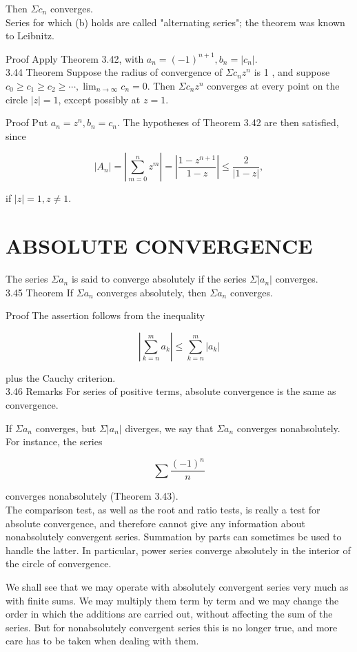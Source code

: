 \documentclass[10pt]{article}
\begin{document}
Then $\Sigma c_{n}$ converges.\\
Series for which (b) holds are called "alternating series"; the theorem was known to Leibnitz.

Proof Apply Theorem 3.42, with $a_{n}=(-1)^{n+1}, b_{n}=\left|c_{n}\right|$.\\
3.44 Theorem Suppose the radius of convergence of $\Sigma c_{n} z^{n}$ is 1 , and suppose $c_{0} \geq c_{1} \geq c_{2} \geq \cdots, \lim _{n \rightarrow \infty} c_{n}=0$. Then $\Sigma c_{n} z^{n}$ converges at every point on the circle $|z|=1$, except possibly at $z=1$.

Proof Put $a_{n}=z^{n}, b_{n}=c_{n}$. The hypotheses of Theorem 3.42 are then satisfied, since

$$
\left|A_{n}\right|=\left|\sum_{m=0}^{n} z^{m}\right|=\left|\frac{1-z^{n+1}}{1-z}\right| \leq \frac{2}{|1-z|},
$$

if $|z|=1, z \neq 1$.

\section*{ABSOLUTE CONVERGENCE}
The series $\Sigma a_{n}$ is said to converge absolutely if the series $\Sigma\left|a_{n}\right|$ converges.\\
3.45 Theorem If $\Sigma a_{n}$ converges absolutely, then $\Sigma a_{n}$ converges.

Proof The assertion follows from the inequality

$$
\left|\sum_{k=n}^{m} a_{k}\right| \leq \sum_{k=n}^{m}\left|a_{k}\right|
$$

plus the Cauchy criterion.\\
3.46 Remarks For series of positive terms, absolute convergence is the same as convergence.

If $\Sigma a_{n}$ converges, but $\Sigma\left|a_{n}\right|$ diverges, we say that $\Sigma a_{n}$ converges nonabsolutely. For instance, the series

$$
\sum \frac{(-1)^{n}}{n}
$$

converges nonabsolutely (Theorem 3.43).\\
The comparison test, as well as the root and ratio tests, is really a test for absolute convergence, and therefore cannot give any information about nonabsolutely convergent series. Summation by parts can sometimes be used to handle the latter. In particular, power series converge absolutely in the interior of the circle of convergence.

We shall see that we may operate with absolutely convergent series very much as with finite sums. We may multiply them term by term and we may change the order in which the additions are carried out, without affecting the sum of the series. But for nonabsolutely convergent series this is no longer true, and more care has to be taken when dealing with them.
\end{document}

